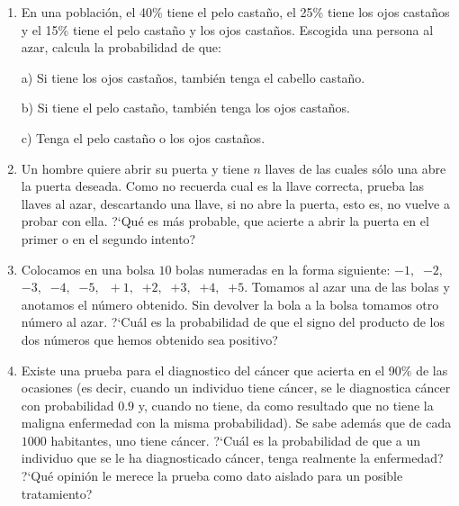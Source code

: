 \begin{adjustwidth}{5mm}{5mm}
\begin{enumerate}[PB. 1. ]
\item En una población, el 40\% tiene el pelo castaño, el 25\% tiene los ojos castaños y el 15\% tiene el pelo castaño y los ojos castaños. Escogida una persona al azar, calcula la probabilidad de que:

a) Si tiene los ojos castaños, también tenga el cabello castaño.

b) Si tiene el pelo castaño, también tenga los ojos castaños.

c) Tenga el pelo castaño o los ojos castaños.

\hspace{-1cm}\vspace{1cm}





\item Un hombre quiere abrir su puerta y tiene $n$ llaves de las cuales sólo una abre la puerta deseada. Como no recuerda cual es la llave correcta, prueba las llaves al azar, descartando una llave, si no abre la puerta, esto es, no vuelve a probar con ella. ?`Qué es más probable, que acierte a abrir la puerta en el primer o en el segundo intento? 

\hspace{-1cm}\vspace{1cm} 


\item Colocamos en una bolsa $10$ bolas numeradas en la forma siguiente: $-1, \ $ $ -2, \ $ $-3, \ $ $-4, \ $ $-5, $ $\ +1, \ $ $+2, \ $ $+3, \ $ $+4, \ $ $+5$. Tomamos al azar una de las bolas y anotamos el número obtenido. Sin devolver la bola a la bolsa tomamos otro número al azar. ?`Cuál es la probabilidad de que el signo del producto de los dos números que hemos obtenido sea positivo? 

\hspace{-1cm}\vspace{1cm} 

\item Existe una prueba para el diagnostico del cáncer que acierta en el 90\% de las ocasiones (es decir, cuando un individuo tiene cáncer, se le diagnostica cáncer con probabilidad $0.9$ y, cuando no tiene, da como resultado que no tiene la maligna enfermedad con la misma probabilidad). Se sabe además que de cada $1000$ habitantes, uno tiene cáncer. ?`Cuál es la probabilidad de que a un individuo que se le ha diagnosticado cáncer, tenga realmente la enfermedad? ?`Qué opinión le merece la prueba como dato aislado para un posible tratamiento? 

\hspace{-1cm}\vspace{1cm} 

\end{enumerate}

\end{adjustwidth}

